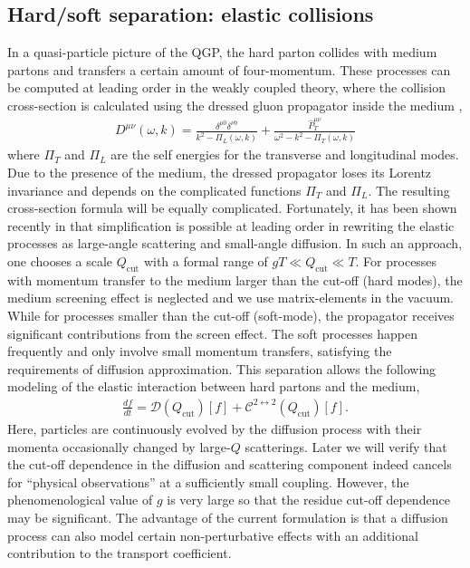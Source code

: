 \subsection{Hard/soft separation: elastic collisions}
In a quasi-particle picture of the QGP, the hard parton collides with medium partons and transfers a certain amount of four-momentum.
These processes can be computed at leading order in the weakly coupled theory, where the collision cross-section is calculated using the dressed gluon propagator inside the medium \cite{PhysRevD.44.1298},
\begin{eqnarray}
D^{\mu\nu}(\omega, k) = \frac{\delta^{\mu 0}\delta^{\nu 0}}{k^2 - \Pi_L(\omega, k)} + \frac{\hat{P}_T^{\mu\nu}}{\omega^2 - k^2 - \Pi_T(\omega, k)}
\end{eqnarray}
where $\Pi_T$ and $\Pi_L$ are the self energies for the transverse and longitudinal modes.
Due to the presence of the medium, the dressed propagator loses its Lorentz invariance and depends on the complicated functions $\Pi_T$ and $\Pi_L$.
The resulting cross-section formula will be equally complicated.
Fortunately, it has been shown recently in \cite{Ghiglieri:2015ala} that simplification is possible at leading order in rewriting the elastic processes as large-angle scattering and small-angle diffusion.
In such an approach, one chooses a scale $Q_\textrm{cut}$ with a formal range of $gT \ll Q_\textrm{cut} \ll T$.
For processes with momentum transfer to the medium larger than the cut-off  (hard modes), the medium screening effect is neglected and we use matrix-elements in the vacuum.
While for processes smaller than the cut-off (soft-mode), the propagator receives significant contributions from the screen effect.
The soft processes happen frequently and only involve small momentum transfers, satisfying the requirements of diffusion approximation.
This separation allows the following modeling of the elastic interaction between hard partons and the medium,
\begin{eqnarray}
\frac{df}{dt} = \mathcal{D}(Q_{\textrm{cut}})[f] + \mathcal{C}^{2\leftrightarrow 2}(Q_{\textrm{cut}})[f].
\end{eqnarray}
Here, particles are continuously evolved by the diffusion process with their momenta occasionally changed by large-$Q$ scatterings.
Later we will verify that the cut-off dependence in the diffusion and scattering component indeed cancels for ``physical observations'' at a sufficiently small coupling.
However, the phenomenological value of $g$ is very large so that the residue cut-off dependence may be significant. 
The advantage of the current formulation is that a diffusion process can also model certain non-perturbative effects with an additional contribution to the transport coefficient.

